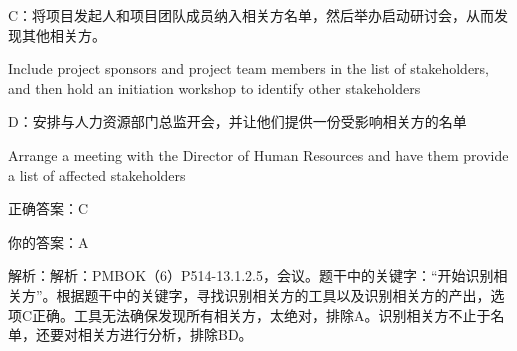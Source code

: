 C：将项目发起人和项目团队成员纳入相关方名单，然后举办启动研讨会，从而发现其他相关方。

Include project sponsors and project team members in the list of stakeholders, and then hold an initiation workshop to identify other stakeholders

D：安排与人力资源部门总监开会，并让他们提供一份受影响相关方的名单

Arrange a meeting with the Director of Human Resources and have them provide a list of affected stakeholders

正确答案：C

你的答案：A

解析：解析：PMBOK（6）P514-13.1.2.5，会议。题干中的关键字：“开始识别相关方”。根据题干中的关键字，寻找识别相关方的工具以及识别相关方的产出，选项C正确。工具无法确保发现所有相关方，太绝对，排除A。识别相关方不止于名单，还要对相关方进行分析，排除BD。


